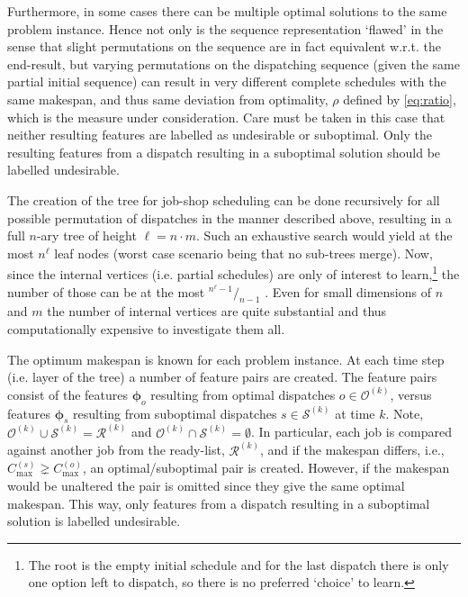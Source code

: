 \documentclass[smallextended]{llncs}
\newcommand{\vphi}{{\boldsymbol{\phi}}}
\begin{document}
Furthermore, in some cases there can be multiple optimal solutions to the same problem instance. Hence not only is the 
sequence representation `flawed' in the sense that slight permutations on the sequence are in fact equivalent w.r.t. 
the end-result, but varying permutations on the dispatching sequence (given the same partial initial sequence) can 
result in very different complete schedules with the same makespan, and thus same deviation from optimality, $\rho$ 
defined by \cref{eq:ratio}, which is the measure under consideration. Care must be taken in this case that neither 
resulting features are labelled as undesirable or suboptimal. Only the resulting features from a dispatch resulting in 
a suboptimal solution should be labelled undesirable. 

The creation of the tree for job-shop scheduling can be done recursively for all possible permutation of dispatches 
in the manner described above, resulting in a full \mbox{$n$-ary} tree %
of height $\ell=n\cdot m$. Such an exhaustive search would yield at the most $n^{\ell}$ leaf nodes (worst case scenario being that no sub-trees merge). Now, since the internal vertices (i.e. partial schedules) are only of interest to learn,\footnote{The root is the empty initial schedule and for the last dispatch there is only one option left to dispatch, so there is no preferred `choice' to learn.} the number of those can be at the most \mbox{${}^{n^{\ell}-1}/_{n-1}$} \cite{Rosen03}.
Even for small dimensions of $n$ and $m$ the number of internal vertices are quite substantial and thus 
computationally expensive to investigate them all. 

The optimum makespan is known for each problem instance. 
At each time step (i.e. layer of the tree) a number of feature pairs are created. The feature pairs consist of the features 
$\vphi_o$ resulting from optimal dispatches $o\in\mathcal{O}^{(k)}$, versus features $\vphi_s$ resulting from 
suboptimal dispatches $s\in\mathcal{S}^{(k)}$ at time $k$. Note, 
$\mathcal{O}^{(k)}\cup\mathcal{S}^{(k)}=\mathcal{R}^{(k)}$ and $\mathcal{O}^{(k)}\cap\mathcal{S}^{(k)}=\emptyset$.
In particular, each job is compared against another job from the ready-list, $\mathcal{R}^{(k)}$, and if the makespan differs, i.e., $C_{\max}^{(s)} \gneq C_{\max}^{(o)}$, an optimal/suboptimal pair is created. However, if the makespan would be unaltered the pair is omitted since they give the same optimal makespan. This way, only features from a dispatch resulting in a suboptimal solution is labelled undesirable.
\end{document}
